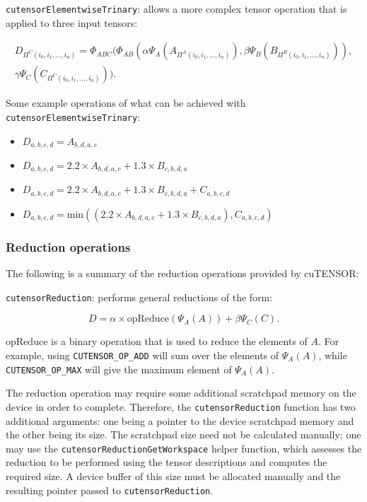 \documentclass[12pt]{article}
\begin{document}
\vspace{0.5em}\texttt{cutensorElementwiseTrinary}: allows a more complex tensor operation that is applied to three input tensors:

\begin{multline*}
D_{\Pi^C(i_0,i_1,...,i_n)} = \Phi_{ABC}(
  \Phi_{AB}(
    \alpha\Psi_A(A_{\Pi^A(i_0,i_1,...,i_n)}),
    \beta\Psi_B(B_{\Pi^B(i_0,i_1,...,i_n)})
  ),\\
  \gamma\Psi_C(C_{\Pi^C(i_0,i_1,...,i_n)})
).
\end{multline*}

\noindent Some example operations of what can be achieved with \texttt{cutensorElementwi\-seTrinary}:
\begin{itemize}
\item $D_{a,b,c,d} = A_{b,d,a,c}$
\item $D_{a,b,c,d} = 2.2 \times A_{b,d,a,c} + 1.3 \times B_{c,b,d,a}$
\item $D_{a,b,c,d} = 2.2 \times A_{b,d,a,c} + 1.3 \times B_{c,b,d,a} + C_{a,b,c,d}$
\item $D_{a,b,c,d} = \mathrm{min}((2.2 \times A_{b,d,a,c} + 1.3 \times B_{c,b,d,a}), C_{a,b,c,d})$
\end{itemize}

\subsubsection{Reduction operations} \label{cutensor::reduction}
The following is a summary of the reduction operations provided by cuTENSOR:

\vspace{0.5em}\texttt{cutensorReduction}: performs general reductions of the form:

\begin{equation*}
D = \alpha \times \mathrm{opReduce}(\Psi_A(A)) + \beta \Psi_C(C).
\end{equation*}

\noindent $\mathrm{opReduce}$ is a binary operation that is used to reduce the elements of $A$. For example, using \texttt{CUTENSOR\_OP\_ADD} will sum over the elements of $\Psi_A(A)$, while \texttt{CUTENSOR\_OP\_MAX} will give the maximum element of $\Psi_A(A)$.

The reduction operation may require some additional scratchpad memory on the device in order to complete. Therefore, the \texttt{cutensorReduction} function has two additional arguments: one being a pointer to the device scratchpad memory and the other being its size. The scratchpad size need not be calculated manually; one may use the \texttt{cutensorReductionGetWorkspace} helper function, which assesses the reduction to be performed using the tensor descriptions and computes the required size. A device buffer of this size must be allocated manually and the resulting pointer passed to \texttt{cutensorReduction}.
\end{document}
